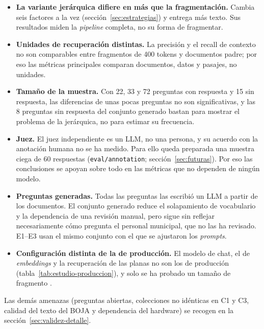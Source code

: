 \begin{itemize}
  \item \textbf{La variante jerárquica difiere en más que la fragmentación.} Cambia seis factores a la vez (sección~\ref{sec:estrategias}) y entrega más texto. Sus resultados miden la \emph{pipeline} completa, no su forma de fragmentar.
  \item \textbf{Unidades de recuperación distintas.} La precisión y el recall de contexto no son comparables entre fragmentos de 400 tokens y documentos padre; por eso las métricas principales comparan documentos, datos y pasajes, no unidades.
  \item \textbf{Tamaño de la muestra.} Con 22, 33 y 72 preguntas con respuesta y 15 sin respuesta, las diferencias de unas pocas preguntas no son significativas, y las 8 preguntas sin respuesta del conjunto generado bastan para mostrar el problema de la jerárquica, no para estimar su frecuencia.
  \item \textbf{Juez.} El juez independiente es un LLM, no una persona, y su acuerdo con la anotación humana no se ha medido. Para ello queda preparada una muestra ciega de 60 respuestas (\texttt{eval/annotation}; sección~\ref{sec:futuras}). Por eso las conclusiones se apoyan sobre todo en las métricas que no dependen de ningún modelo.
  \item \textbf{Preguntas generadas.} Todas las preguntas las escribió un LLM a partir de los documentos. El conjunto generado reduce el solapamiento de vocabulario y la dependencia de una revisión manual, pero sigue sin reflejar necesariamente cómo pregunta el personal municipal, que no las ha revisado. E1--E3 usan el mismo conjunto con el que se ajustaron los \emph{prompts}.
  \item \textbf{Configuración distinta de la de producción.} El modelo de chat, el de \emph{embeddings} y la recuperación de las planas no son los de producción (tabla~\ref{tab:estudio-produccion}), y solo se ha probado un tamaño de fragmento \cite{chen2024densex}.
\end{itemize}

Las demás amenazas (preguntas abiertas, colecciones no idénticas en C1 y C3, calidad del texto del BOJA y dependencia del hardware) se recogen en la sección~\ref{sec:validez-detalle}.
